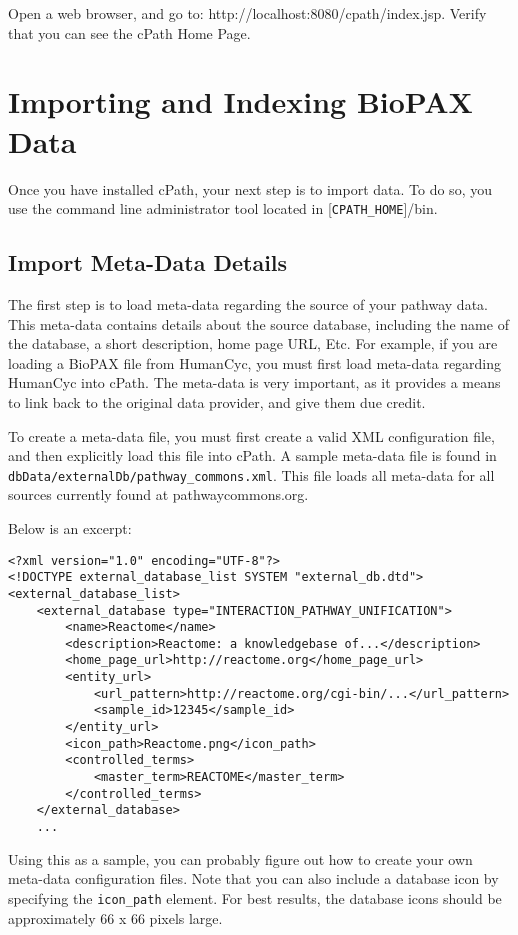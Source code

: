 \documentclass[letterpaper,12pt]{article}
\begin{document}
Open a web browser, and go to: http://localhost:8080/cpath/index.jsp. Verify that you can see the cPath Home Page.

\section{Importing and Indexing BioPAX Data}

Once you have installed cPath, your next step is to import data.  To do so, you use the command line administrator tool located in [\verb+CPATH_HOME+]/bin.

\subsection{Import Meta-Data Details}

The first step is to load meta-data regarding the source of your pathway data.  This meta-data contains details about the source database, including the name of the database, a short description, home page URL, Etc.  For example, if you are loading a BioPAX file from HumanCyc, you must first load meta-data regarding HumanCyc into cPath.  The meta-data is very important, as it provides a means to link back to the original data provider, and give them due credit.

To create a meta-data file, you must first create a valid XML configuration file, and then explicitly load this file into cPath.  A sample meta-data file is found in \verb+dbData/externalDb/pathway_commons.xml+.  This file loads all meta-data for all sources currently found at pathwaycommons.org.

Below is an excerpt:

\begin{verbatim}
<?xml version="1.0" encoding="UTF-8"?>
<!DOCTYPE external_database_list SYSTEM "external_db.dtd">
<external_database_list>
    <external_database type="INTERACTION_PATHWAY_UNIFICATION">
        <name>Reactome</name>
        <description>Reactome: a knowledgebase of...</description>
        <home_page_url>http://reactome.org</home_page_url>
        <entity_url>
            <url_pattern>http://reactome.org/cgi-bin/...</url_pattern>
            <sample_id>12345</sample_id>
        </entity_url>
        <icon_path>Reactome.png</icon_path>
        <controlled_terms>
            <master_term>REACTOME</master_term>
        </controlled_terms>
    </external_database>
    ...
\end{verbatim}

Using this as a sample, you can probably figure out how to create your own meta-data configuration files.  Note that you can also include a database icon by specifying the \verb+icon_path+ element.  For best results, the database icons should be approximately 66 x 66 pixels large.
\end{document}
